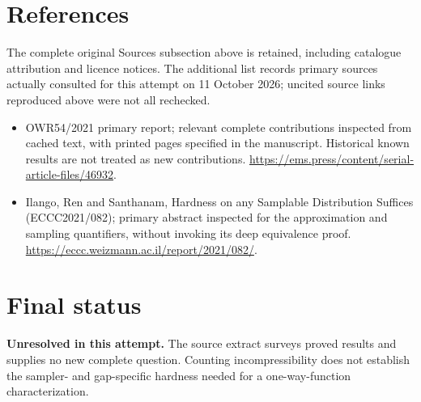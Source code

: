 \documentclass[11pt]{article}
\begin{document}
\section{References}
The complete original Sources subsection above is retained, including catalogue attribution and licence notices. The additional list records primary sources actually consulted for this attempt on 11 October 2026; uncited source links reproduced above were not all rechecked.
\begin{itemize}
\item OWR54/2021 primary report; relevant complete contributions inspected from cached text, with printed pages specified in the manuscript. Historical known results are not treated as new contributions. \url{https://ems.press/content/serial-article-files/46932}.
\item Ilango, Ren and Santhanam, Hardness on any Samplable Distribution Suffices (ECCC2021/082); primary abstract inspected for the approximation and sampling quantifiers, without invoking its deep equivalence proof. \url{https://eccc.weizmann.ac.il/report/2021/082/}.
\end{itemize}
\section{Final status}
\textbf{Unresolved in this attempt.} The source extract surveys proved results and supplies no new complete question. Counting incompressibility does not establish the sampler- and gap-specific hardness needed for a one-way-function characterization.
\end{document}
